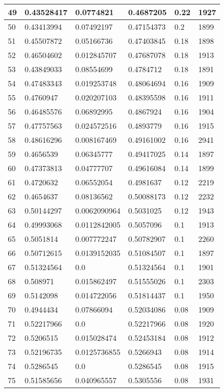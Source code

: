 \begin{longtable}{|l|l|l|l|l|l|}
49 & 0.43528417 & 0.0774821 & 0.4687205 & 0.22 & 1927 \\ \hline 
50 & 0.43413994 & 0.07492197 & 0.47154373 & 0.2 & 1899 \\ \hline 
51 & 0.45507872 & 0.05166736 & 0.47403845 & 0.18 & 1898 \\ \hline 
52 & 0.46504602 & 0.012845707 & 0.47687078 & 0.18 & 1913 \\ \hline 
53 & 0.43849033 & 0.08554699 & 0.4784712 & 0.18 & 1891 \\ \hline 
54 & 0.47483343 & 0.019253748 & 0.48064694 & 0.16 & 1909 \\ \hline 
55 & 0.4760947 & 0.020207103 & 0.48395598 & 0.16 & 1911 \\ \hline 
56 & 0.46485576 & 0.06892995 & 0.4867924 & 0.16 & 1904 \\ \hline 
57 & 0.47757563 & 0.024572516 & 0.4893779 & 0.16 & 1915 \\ \hline 
58 & 0.48616296 & 0.008167469 & 0.49161002 & 0.16 & 2941 \\ \hline 
59 & 0.4656539 & 0.06345777 & 0.49417025 & 0.14 & 1897 \\ \hline 
60 & 0.47373813 & 0.04777707 & 0.49616084 & 0.14 & 1899 \\ \hline 
61 & 0.4720632 & 0.06552054 & 0.4981637 & 0.12 & 2219 \\ \hline 
62 & 0.4654637 & 0.08136562 & 0.50088173 & 0.12 & 2232 \\ \hline 
63 & 0.50144297 & 0.0062090964 & 0.5031025 & 0.12 & 1943 \\ \hline 
64 & 0.49993068 & 0.0112842005 & 0.5057096 & 0.1 & 1913 \\ \hline 
65 & 0.5051814 & 0.007772247 & 0.50782907 & 0.1 & 2260 \\ \hline 
66 & 0.50712615 & 0.0139152035 & 0.51084507 & 0.1 & 1897 \\ \hline 
67 & 0.51324564 & 0.0 & 0.51324564 & 0.1 & 1901 \\ \hline 
68 & 0.508971 & 0.015862497 & 0.51555026 & 0.1 & 2303 \\ \hline 
69 & 0.5142098 & 0.014722056 & 0.51814437 & 0.1 & 1950 \\ \hline 
70 & 0.4944434 & 0.07866094 & 0.52034086 & 0.08 & 1909 \\ \hline 
71 & 0.52217966 & 0.0 & 0.52217966 & 0.08 & 1920 \\ \hline 
72 & 0.5206515 & 0.015028474 & 0.52453184 & 0.08 & 1912 \\ \hline 
73 & 0.52196735 & 0.0125736855 & 0.5266943 & 0.08 & 1914 \\ \hline 
74 & 0.5286545 & 0.0 & 0.5286545 & 0.08 & 1915 \\ \hline 
75 & 0.51585656 & 0.040965557 & 0.5305556 & 0.08 & 1931 \\ \hline 
\end{longtable}